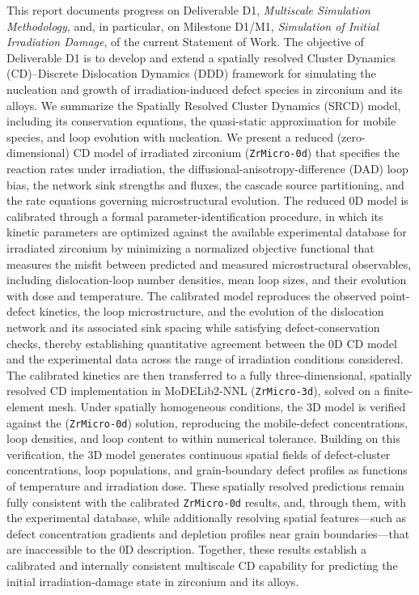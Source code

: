 \documentclass{article}
\newcommand{\ZrM}{\texttt{ZrMicro-3d}}
\newcommand{\MoD}{\textsf{MoDELib2-NNL}}
\newcommand{\ZrOd}{\texttt{ZrMicro-0d}}
\begin{document}
This report documents progress on Deliverable D1, \emph{Multiscale Simulation Methodology}, and, in particular, on Milestone D1/M1, \emph{Simulation of Initial Irradiation Damage}, of the current Statement of Work. The objective of Deliverable D1 is to develop and extend a spatially resolved Cluster Dynamics (CD)–Discrete Dislocation Dynamics (DDD) framework for simulating the nucleation and growth of irradiation-induced defect species in zirconium and its alloys. We summarize the Spatially Resolved Cluster Dynamics (SRCD) model, including its conservation equations, the quasi-static approximation for mobile species, and loop evolution with nucleation. We present a reduced (zero-dimensional) CD model of irradiated zirconium ({\ZrOd}) that specifies the reaction rates under irradiation, the diffusional-anisotropy-difference (DAD) loop bias, the network sink strengths and fluxes, the cascade source partitioning, and the rate equations governing microstructural evolution. The reduced 0D model is calibrated through a formal parameter-identification procedure, in which its kinetic parameters are optimized against the available experimental database for irradiated zirconium by minimizing a normalized objective functional that measures the misfit between predicted and measured microstructural observables, including dislocation-loop number densities, mean loop sizes, and their evolution with dose and temperature. The calibrated model reproduces the observed point-defect kinetics, the loop microstructure, and the evolution of the dislocation network and its associated sink spacing while satisfying defect-conservation checks, thereby establishing quantitative agreement between the 0D CD model and the experimental data across the range of irradiation conditions considered. The calibrated kinetics are then transferred to a fully three-dimensional, spatially resolved CD implementation in {\MoD} ({\ZrM}), solved on a finite-element mesh. Under spatially homogeneous conditions, the 3D model is verified against the ({\ZrOd}) solution, reproducing the mobile-defect concentrations, loop densities, and loop content to within numerical tolerance. Building on this verification, the 3D model generates continuous spatial fields of defect-cluster concentrations, loop populations, and grain-boundary defect profiles as functions of temperature and irradiation dose. These spatially resolved predictions remain fully consistent with the calibrated {\ZrOd} results, and, through them, with the experimental database, while additionally resolving spatial features—such as defect concentration gradients and depletion profiles near grain boundaries—that are inaccessible to the 0D description. Together, these results establish a calibrated and internally consistent multiscale CD capability for predicting the initial irradiation-damage state in zirconium and its alloys.
\newpage
\tableofcontents
\newpage
\end{document}
